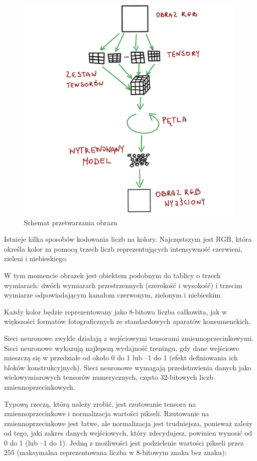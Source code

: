 \documentclass[brudnopis]{xmgr}
\begin{document}
 \begin{figure}[!tbh]
\centering
\includegraphics[width=.8\hsize]{fig/5}
\caption{Schemat przetwarzania obrazu\label{RYS.5}}
\end{figure}
 
 Istnieje kilka sposobów kodowania liczb na kolory. Najczęstszym jest
RGB, która określa kolor za pomocą trzech liczb reprezentujących intensywność czerwieni, zieleni i niebieskiego. 

W tym momencie obrazek jest obiektem podobnym do tablicy o trzech wymiarach: dwóch wymiarach przestrzennych (szerokość i wysokość) i trzecim wymiarze odpowiadającym kanałom czerwonym, zielonym i niebieskim. 

Każdy kolor będzie reprezentowany jako 8-bitowa liczba całkowita, jak w większości formatów fotograficznych ze standardowych aparatów konsumenckich.

Sieci neuronowe zwykle działają z wejściowymi tensorami zmiennoprzecinkowymi. Sieci neuronowe wykazują najlepszą wydajność treningu, gdy dane wejściowe mieszczą się w przedziale od około 0 do 1 lub –1 do 1 (efekt definiowania ich bloków konstrukcyjnych). Sieci neuronowe wymagają przedstawienia danych jako wielowymiarowych tensorów numerycznych, często 32-bitowych liczb zmiennoprzecinkowych.


Typową rzeczą, którą należy zrobić, jest rzutowanie tensora na zmiennoprzecinkowe i normalizacja wartości pikseli. Rzutowanie na zmiennoprzecinkowe jest łatwe, ale normalizacja jest trudniejsza, ponieważ zależy od tego, jaki zakres danych wejściowych, który zdecydujesz, powinien wynosić od 0 do 1 (lub –1 do 1). Jedną z możliwości jest podzielenie wartości pikseli przez 255 (maksymalna reprezentowana liczba w 8-bitowym znaku bez znaku):
\end{document}
